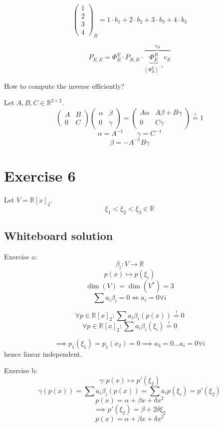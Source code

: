 \documentclass[a4paper]{article}
\theoremstyle{definition}
\begin{document}
\[ \begin{pmatrix} 1 \\ 2 \\ 3 \\ 4 \end{pmatrix}_B = 1 \cdot b_1 + 2 \cdot b_2 + 3 \cdot b_3 + 4 \cdot b_4 \]

\[ P_{E,E} = \Phi_B^E \cdot P_{B,B} \cdot \overbrace{\underbrace{\Phi_{E}^B}_{(\Phi_B^E)^{-1}} v_E}^{v_B} \]



How to compute the inverse efficiently?

Let $A, B, C \in \mathbb R^{2 \times 2}$.
\[
  \begin{pmatrix}
    A & B \\
    0 & C
  \end{pmatrix} \begin{pmatrix}
    \alpha & \beta \\
    0 & \gamma
  \end{pmatrix}
  = \begin{pmatrix}
    A \alpha & A \beta + B \gamma \\
    0 & C \gamma
  \end{pmatrix}
  \stackrel!= \mathcal 1
\]
\[ \alpha = A^{-1} \qquad \gamma = C^{-1} \]
\[ \beta = -A^{-1} B \gamma \]

\section{Exercise 6}
\begin{ex}
  Let $V = \mathbb R[x]_2$.
  \[ \xi_1 < \xi_2 < \xi_3 \in \mathbb R \]
\end{ex}

\subsection{Whiteboard solution}

Exercise a:
\[ \beta_i: V \to \mathbb R \]
\[ p(x) \mapsto p(\xi_i) \]
\[ \dim(V) = \dim(V^*) = 3 \]
\[ \sum a_i \beta_i =0 \iff a_i = 0 \forall i \]

\[ \forall p \in \mathbb R[x]_2: \sum a_i \beta_i(p(x)) \stackrel!= 0 \]
\[ \forall p \in \mathbb R[x]_2: \sum a_i \beta_i(\xi_i) \stackrel!= 0 \]

\[ \implies p_1(\xi_1) = p_1(x_2) = 0 \implies a_3 = 0 \dots a_i = 0 \forall i \]
hence linear independent.

Exercise b:
\[ \gamma: p(x) \mapsto p'(\xi_2) \]
\[ \gamma(p(x)) = \sum a_i \beta_i(p(x)) = \sum a_i p(\xi_i) = p'(\xi_2) \]
\[ p(x) = \alpha + \beta x + \delta x^2 \]
\[ \implies p'(\xi_2) = \beta + 2 \delta \xi_2 \]
\[ p(x) = \alpha + \beta x + \delta x^2 \]
\end{document}
